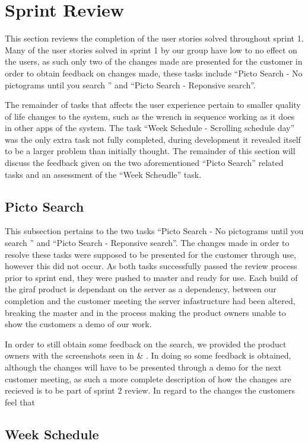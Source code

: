 \section{Sprint Review}\label{s1rev}
This section reviews the completion of the user stories solved throughout sprint 1.
Many of the user stories solved in sprint 1 by our group have low to no effect on the users, as such only two of the changes made are presented for the customer in order to obtain feedback on changes made, these tasks include ``Picto Search - No pictograms until you search '' and ``Picto Search - Reponsive search''.

The remainder of tasks that affects the user experience pertain to smaller quality of life changes to the system, such as the wrench in sequence working as it does in other apps of the system.
The task ``Week Schedule - Scrolling schedule day'' was the only extra task not fully completed, during development it revealed itself to be a larger problem than initially thought.
The remainder of this section will discuss the feedback given on the two aforementioned ``Picto Search'' related tasks and an assessment of the ``Week Scheudle'' task.

\subsection{Picto Search}
This subsection pertains to the two tasks ``Picto Search - No pictograms until you search '' and ``Picto Search - Reponsive search''.
The changes made in order to resolve these tasks were supposed to be presented for the customer through use, however this did not occur.
As both tasks successfully passed the review process prior to sprint end, they were pushed to master and ready for use.
Each build of the giraf product is dependant on the server as a dependency, between our completion and the customer meeting the server infastructure had been altered, breaking the master and in the process making the product owners unable to show the customers a demo of our work.

In order to still obtain some feedback on the search, we provided the product owners with the screenshots seen in  \& .
In doing so some feedback is obtained, although the changes will have to be presented through a demo for the next customer meeting, as such a more complete description of how the changes are recieved is to be part of sprint 2 review.
\bigskip
\noindent
In regard to the changes the customers feel that

\subsection{Week Schedule}


